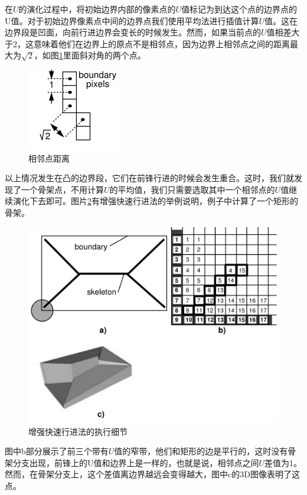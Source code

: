 在$U$的演化过程中，将初始边界内部的像素点的$U$值标记为到达这个点的边界点的U值。对于初始边界像素点中间的边界点我们使用平均法进行插值计算$U$值。这在边界段是凹面，向前行进边界会变长的时候发生。然而，如果当前点的$U$值相差大于2，这意味着他们在边界上的原点不是相邻点，因为边界上相邻点之间的距离最大为$\sqrt2$，如图\ref{neighbor_distance}里面斜对角的两个点。
\begin{figure}[h!]
    \centering
    \includegraphics[height=70bp]{figure/neighbor_distance.png}
    \caption{相邻点距离}
    \label{neighbor_distance}
\end{figure}
以上情况发生在凸的边界段，它们在前锋行进的时候会发生重合。这时，我们就发现了一个骨架点，不用计算$U$的平均值，我们只需要选取其中一个相邻点的$U$值继续演化下去即可。图片\ref{afmm_details}有增强快速行进法的举例说明，例子中计算了一个矩形的骨架。
\begin{figure}[h!]
    \centering
    \includegraphics[height=180bp]{figure/afmm_details.png}
    \caption{增强快速行进法的执行细节}
    \label{afmm_details}
\end{figure}
图中b部分展示了前三个带有$U$值的窄带，他们和矩形的边是平行的，这时没有骨架分支出现，前锋上的U值和边界上是一样的，也就是说，相邻点之间$U$差值为1。然而，在骨架分支上，这个差值离边界越远会变得越大，图中c的3D图像表明了这点。

